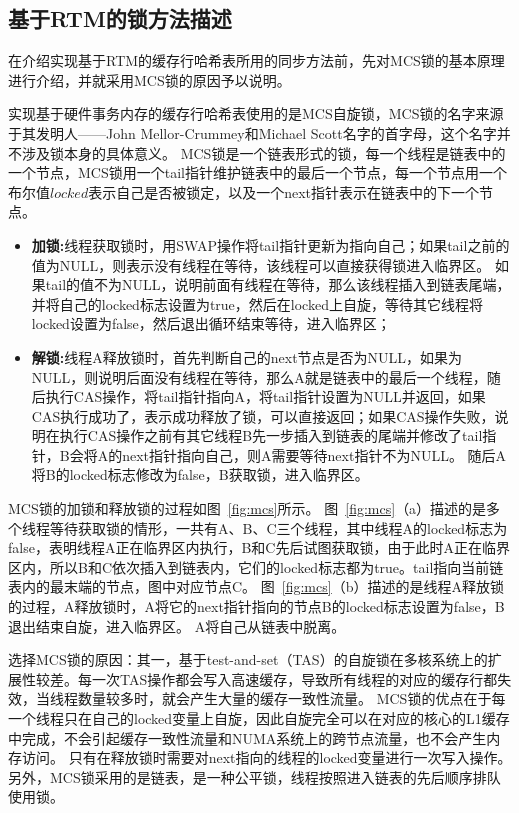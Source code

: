 \subsection{基于RTM的锁方法描述}
\label{sec:rtm_lock}

在介绍实现基于RTM的缓存行哈希表所用的同步方法前，先对MCS锁的基本原理进行介绍，并就采用MCS锁的原因予以说明。


实现基于硬件事务内存的缓存行哈希表使用的是MCS自旋锁\cite{mellor1991algorithms}，MCS锁的名字来源于其发明人——John Mellor-Crummey和Michael Scott名字的首字母，这个名字并不涉及锁本身的具体意义。
MCS锁是一个链表形式的锁，每一个线程是链表中的一个节点，MCS锁用一个tail指针维护链表中的最后一个节点，每一个节点用一个布尔值$locked$表示自己是否被锁定，以及一个next指针表示在链表中的下一个节点。
\begin{itemize}
\item \textbf{加锁:}线程获取锁时，用SWAP操作将tail指针更新为指向自己；如果tail之前的值为NULL，则表示没有线程在等待，该线程可以直接获得锁进入临界区。
如果tail的值不为NULL，说明前面有线程在等待，那么该线程插入到链表尾端，并将自己的locked标志设置为true，然后在locked上自旋，等待其它线程将locked设置为false，然后退出循环结束等待，进入临界区；
\item \textbf{解锁:}线程A释放锁时，首先判断自己的next节点是否为NULL，如果为NULL，则说明后面没有线程在等待，那么A就是链表中的最后一个线程，随后执行CAS操作，将tail指针指向A，将tail指针设置为NULL并返回，如果CAS执行成功了，表示成功释放了锁，可以直接返回；如果CAS操作失败，说明在执行CAS操作之前有其它线程B先一步插入到链表的尾端并修改了tail指针，B会将A的next指针指向自己，则A需要等待next指针不为NULL。
随后A将B的locked标志修改为false，B获取锁，进入临界区。
\end{itemize}

MCS锁的加锁和释放锁的过程如图~\ref{fig:mcs}所示。
图~\ref{fig:mcs}（a）描述的是多个线程等待获取锁的情形，一共有A、B、C三个线程，其中线程A的locked标志为false，表明线程A正在临界区内执行，B和C先后试图获取锁，由于此时A正在临界区内，所以B和C依次插入到链表内，它们的locked标志都为true。tail指向当前链表内的最末端的节点，图中对应节点C。
图~\ref{fig:mcs}（b）描述的是线程A释放锁的过程，A释放锁时，A将它的next指针指向的节点B的locked标志设置为false，B退出结束自旋，进入临界区。
A将自己从链表中脱离。

选择MCS锁的原因：其一，基于test-and-set（TAS）的自旋锁在多核系统上的扩展性较差。每一次TAS操作都会写入高速缓存，导致所有线程的对应的缓存行都失效，当线程数量较多时，就会产生大量的缓存一致性流量。
MCS锁的优点在于每一个线程只在自己的locked变量上自旋，因此自旋完全可以在对应的核心的L1缓存中完成，不会引起缓存一致性流量和NUMA系统上的跨节点流量，也不会产生内存访问。
只有在释放锁时需要对next指向的线程的locked变量进行一次写入操作。
另外，MCS锁采用的是链表，是一种公平锁，线程按照进入链表的先后顺序排队使用锁。



